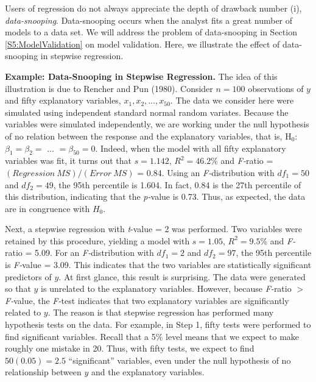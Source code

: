 Users of regression do not always appreciate the depth of drawback
number (i), \textit{data-snooping}. Data-snooping occurs when the
analyst fits a great number of models to a data set. We will address
the problem of data-snooping in Section \ref{S5:ModelValidation} on
model validation. Here, we illustrate the effect of data-snooping in
stepwise regression.

\linejed{}

\textbf{Example: Data-Snooping in Stepwise
Regression.} The
idea of this illustration is due to Rencher and Pun (1980). Consider
$n=100$ observations of $y$ and fifty explanatory variables, $x_1,
x_2, \ldots,x_{50}$. The data we consider here were simulated using
independent standard normal random variates. Because the variables
were simulated independently, we are working under the null
hypothesis of no relation between the response and the explanatory
variables, that is, H$_0$: $\beta_1=\beta_2=$ $\ldots$
$=\beta_{50}=0$. Indeed, when the model with all
fifty explanatory variables was fit, it turns out that $s=1.142$, $%
R^2=46.2\%$ and \textit{F-}ratio = $(Regression~MS) / (Error~MS)$ =
0.84. Using an \textit{F-}distribution with $df_1=50$ and $df_2=49$,
the 95th percentile is 1.604. In fact, 0.84 is the 27th percentile
of this distribution, indicating that the \textit{p-}value is 0.73.
Thus, as expected, the data are in congruence with $H_0$.

Next, a stepwise regression with \textit{t}-value = 2 was performed. Two
variables were retained by this procedure, yielding a model with $s=1.05$, $%
R^2=9.5\%$ and \textit{F-}ratio = 5.09. For an
\textit{F-}distribution with $df_1=2$ and $df_2=97$, the 95th
percentile is \textit{F-}value = 3.09. This indicates that the two
variables are statistically significant predictors of $y$. At first
glance, this result is surprising. The data were generated so
that $y$ is unrelated to the explanatory variables. However, because \textit{%
F-}ratio $>$ \textit{F-}value, the \textit{F-}test indicates that
two explanatory variables are significantly related to $y$. The
reason is that stepwise regression has performed many hypothesis
tests on the data. For example, in Step 1, fifty tests were
performed to find significant variables. Recall that a 5\% level
means that we expect to make roughly one mistake in 20. Thus, with
fifty tests, we expect to find $50(0.05)=2.5$ ``significant''
variables, even under the null hypothesis of no relationship between
$y$ and the explanatory variables.

